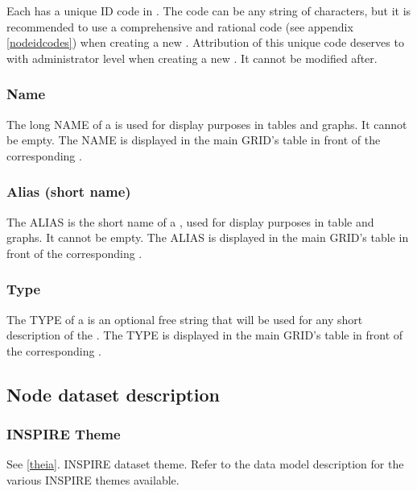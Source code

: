 Each  has a unique ID code in \webobs. The code can be any string of characters, but it is recommended to use a comprehensive and rational code (see appendix \ref{nodeidcodes}) when creating a new . Attribution of this unique code deserves to  with administrator level when creating a new . It cannot be modified after.


\subsubsection{Name}

The long NAME of a  is used for display purposes in tables and graphs. It cannot be empty. The NAME is displayed in the main GRID's table in front of the corresponding .


\subsubsection{Alias (short name)}

The ALIAS is the short name of a , used for display purposes in table and graphs. It cannot be empty. The ALIAS is displayed in the main GRID's table in front of the corresponding .



\subsubsection{Type}

The TYPE of a  is an optional free string that will be used for any short description of the . The TYPE is displayed in the main GRID's table in front of the corresponding .

\subsection{Node dataset description}

\subsubsection{INSPIRE Theme}
See \ref{theia}. INSPIRE dataset theme. Refer to the data model description for the various INSPIRE themes available.

